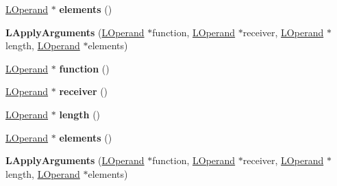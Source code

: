 \begin{DoxyCompactItemize}
\item 
\hyperlink{classv8_1_1internal_1_1_l_operand}{L\+Operand} $\ast$ {\bfseries elements} ()\hypertarget{classv8_1_1internal_1_1_l_apply_arguments_acb08ae582ad76ef25684e2361409c0e4}{}\label{classv8_1_1internal_1_1_l_apply_arguments_acb08ae582ad76ef25684e2361409c0e4}

\item 
{\bfseries L\+Apply\+Arguments} (\hyperlink{classv8_1_1internal_1_1_l_operand}{L\+Operand} $\ast$function, \hyperlink{classv8_1_1internal_1_1_l_operand}{L\+Operand} $\ast$receiver, \hyperlink{classv8_1_1internal_1_1_l_operand}{L\+Operand} $\ast$length, \hyperlink{classv8_1_1internal_1_1_l_operand}{L\+Operand} $\ast$elements)\hypertarget{classv8_1_1internal_1_1_l_apply_arguments_a03722f1b30078ec905687e48dd73c80d}{}\label{classv8_1_1internal_1_1_l_apply_arguments_a03722f1b30078ec905687e48dd73c80d}

\item 
\hyperlink{classv8_1_1internal_1_1_l_operand}{L\+Operand} $\ast$ {\bfseries function} ()\hypertarget{classv8_1_1internal_1_1_l_apply_arguments_af7fa90a86d06b14c9991f9c68115415b}{}\label{classv8_1_1internal_1_1_l_apply_arguments_af7fa90a86d06b14c9991f9c68115415b}

\item 
\hyperlink{classv8_1_1internal_1_1_l_operand}{L\+Operand} $\ast$ {\bfseries receiver} ()\hypertarget{classv8_1_1internal_1_1_l_apply_arguments_a6cd58169b6ce998cb4a7fadaebdf8ae5}{}\label{classv8_1_1internal_1_1_l_apply_arguments_a6cd58169b6ce998cb4a7fadaebdf8ae5}

\item 
\hyperlink{classv8_1_1internal_1_1_l_operand}{L\+Operand} $\ast$ {\bfseries length} ()\hypertarget{classv8_1_1internal_1_1_l_apply_arguments_a7184d82b892039d6cd4cae3b4d9f3f9d}{}\label{classv8_1_1internal_1_1_l_apply_arguments_a7184d82b892039d6cd4cae3b4d9f3f9d}

\item 
\hyperlink{classv8_1_1internal_1_1_l_operand}{L\+Operand} $\ast$ {\bfseries elements} ()\hypertarget{classv8_1_1internal_1_1_l_apply_arguments_acb08ae582ad76ef25684e2361409c0e4}{}\label{classv8_1_1internal_1_1_l_apply_arguments_acb08ae582ad76ef25684e2361409c0e4}

\item 
{\bfseries L\+Apply\+Arguments} (\hyperlink{classv8_1_1internal_1_1_l_operand}{L\+Operand} $\ast$function, \hyperlink{classv8_1_1internal_1_1_l_operand}{L\+Operand} $\ast$receiver, \hyperlink{classv8_1_1internal_1_1_l_operand}{L\+Operand} $\ast$length, \hyperlink{classv8_1_1internal_1_1_l_operand}{L\+Operand} $\ast$elements)\hypertarget{classv8_1_1internal_1_1_l_apply_arguments_a03722f1b30078ec905687e48dd73c80d}{}\label{classv8_1_1internal_1_1_l_apply_arguments_a03722f1b30078ec905687e48dd73c80d}


\end{DoxyCompactItemize}
